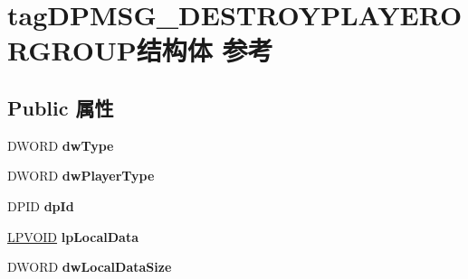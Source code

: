 \hypertarget{structtag_d_p_m_s_g___d_e_s_t_r_o_y_p_l_a_y_e_r_o_r_g_r_o_u_p}{}\section{tag\+D\+P\+M\+S\+G\+\_\+\+D\+E\+S\+T\+R\+O\+Y\+P\+L\+A\+Y\+E\+R\+O\+R\+G\+R\+O\+U\+P结构体 参考}
\label{structtag_d_p_m_s_g___d_e_s_t_r_o_y_p_l_a_y_e_r_o_r_g_r_o_u_p}
\subsection*{Public 属性}
\begin{DoxyCompactItemize}
\item 
\mbox{\label{structtag_d_p_m_s_g___d_e_s_t_r_o_y_p_l_a_y_e_r_o_r_g_r_o_u_p_a7f3cbe61cd35c0386c74e841b05016d9}} 
D\+W\+O\+RD {\bfseries dw\+Type}
\item 
\mbox{\label{structtag_d_p_m_s_g___d_e_s_t_r_o_y_p_l_a_y_e_r_o_r_g_r_o_u_p_a9208094c7c28d43146a423ee597c20a2}} 
D\+W\+O\+RD {\bfseries dw\+Player\+Type}
\item 
\mbox{\label{structtag_d_p_m_s_g___d_e_s_t_r_o_y_p_l_a_y_e_r_o_r_g_r_o_u_p_af42d730c24ce3ac8219afff7c98d9d13}} 
D\+P\+ID {\bfseries dp\+Id}
\item 
\mbox{\label{structtag_d_p_m_s_g___d_e_s_t_r_o_y_p_l_a_y_e_r_o_r_g_r_o_u_p_ad366b13646a3f2271ee7696209b6c462}} 
\hyperlink{interfacevoid}{L\+P\+V\+O\+ID} {\bfseries lp\+Local\+Data}
\item 
\mbox{\label{structtag_d_p_m_s_g___d_e_s_t_r_o_y_p_l_a_y_e_r_o_r_g_r_o_u_p_a2c69d12146097026afc79ab158f5f52a}} 
D\+W\+O\+RD {\bfseries dw\+Local\+Data\+Size}
\item 
\mbox{\label{structtag_d_p_m_s_g___d_e_s_t_r_o_y_p_l_a_y_e_r_o_r_g_r_o_u_p_a4349a544e179e04eb57eae6259d97a21}} 

\end{DoxyCompactItemize}
